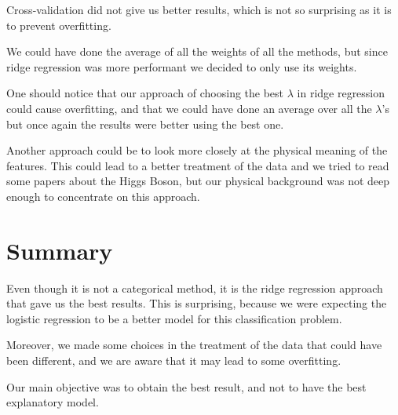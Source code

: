 \documentclass[10pt, oneside]{article}   	%
\begin{document}
Cross-validation did not give us better results, which is not so surprising as it is to prevent overfitting.

We could have done the average of all the weights of all the methods, but since ridge regression was more performant we decided to only use its weights.

One should notice that our approach of choosing the best $\lambda$ in ridge regression could cause overfitting, and that we could have done an average over all the $\lambda$'s but once again the results were better using the best one.

Another approach could be to look more closely at the physical meaning of the features. This could lead to a better treatment of the data and we tried to read some papers about the Higgs Boson, but our physical background was not deep enough to concentrate on this approach. 

\section{Summary}
Even though it is not a categorical method, it is the ridge regression approach that gave us the best results. This is surprising, because we were expecting the logistic regression to be a better model for this classification problem.

Moreover, we made some choices in the treatment of the data that could have been different, and we are aware that it may lead to some overfitting.

Our main objective was to obtain the best result, and not to have the best explanatory model.
\end{document}
